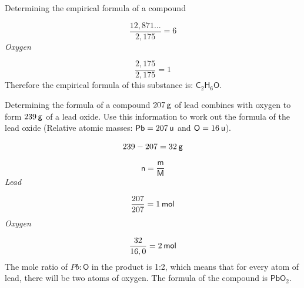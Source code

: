 \begin{wex}{Determining the empirical formula of a compound }
{      \label{m38712*id281223}\nopagebreak\noindent{}
        
    \begin{equation*}
    \frac{12,871...}{2,175}=6
      \end{equation*}
      \label{m38712*id281254}
        \textsl{Oxygen}
      
      \label{m38712*id281261}\nopagebreak\noindent{}
        
    \begin{equation*}
    \frac{2,175}{2,175}=1
      \end{equation*}
      \label{m38712*id281292}Therefore the empirical formula of this substance is: ${\mathsf{C}}_{2}{\mathsf{H}}_{6}\mathsf{O}$.
}
    \end{wex}
    \noindent
\label{m38712*secfhsst!!!underscore!!!id1235}\vspace{-3cm} 
      \noindent
      \begin{wex}{Determining the formula of a compound }{
      \label{m38712*probfhsst!!!underscore!!!id1236}
      \label{m38712*id281333}$207\phantom{\rule{2pt}{0ex}}\mathsf{g}$ of lead combines with oxygen to form $239\phantom{\rule{2pt}{0ex}}\mathsf{g}$ of a lead oxide. Use this information to work out the formula of the lead oxide (Relative atomic masses: $\mathsf{Pb}=207\phantom{\rule{2pt}{0ex}}\mathsf{u}$ and $\mathsf{O}=16\phantom{\rule{2pt}{0ex}}\mathsf{u}$).
}
{
      \label{m38712*id281379}\nopagebreak\noindent{}
    \begin{equation*}
    239-207=32\phantom{\rule{2pt}{0ex}}\mathsf{g}
      \end{equation*}
      \label{m38712*id281407}\nopagebreak\noindent{}
        
    \begin{equation*}
    \mathsf{n}=\frac{\mathsf{m}}{\mathsf{M}}
      \end{equation*}
      \label{m38712*id281427}
        \textsl{Lead}
       
      \label{m38712*id281433}\nopagebreak\noindent{}
        
    \begin{equation*}
    \frac{207}{207}=1\phantom{\rule{2pt}{0ex}}\mathsf{mol}
      \end{equation*}
      \label{m38712*id281460}
        \textsl{Oxygen}
    
      \label{m38712*id281467}\nopagebreak\noindent{}
        
    \begin{equation*}
    \frac{32}{16,0}=2\phantom{\rule{2pt}{0ex}}\mathsf{mol}
      \end{equation*}
      \label{m38712*id281498}The mole ratio of $Pb:\mathsf{O}$ in the product is 1:2, which means that for every atom of lead, there will be two atoms of oxygen. The formula of the compound is $\mathsf{PbO}{}_{2}$. 
}
    \end{wex}
